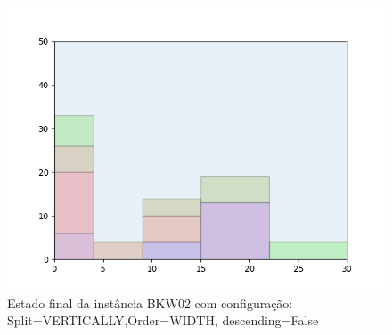 \begin{figure}[H]
    \centering
    \caption[]{Estado final da instância BKW02 com configuração: Split=VERTICALLY,Order=WIDTH, descending=False}
    \label{fig:bkw02-vertically-width-false}
    \includegraphics[scale=0.5]{output/figures/bkw/bkw02/vertically/width/false/00}
\end{figure}